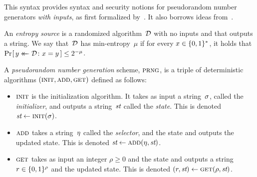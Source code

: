 %
%
%
\label{sec:prng}
This syntax provides syntax and security notions for pseudorandom number
generators \emph{with inputs}, as first formalized by~\cite{barak2005model}. It
also borrows ideas from~\cite{dodis2013security,shrimpton2015provable}.

\begin{definition}\rm
  An \emph{entropy source} is a randomized algorithm~$\mathcal{D}$ with no inputs and
  that outputs a string.
  We say that~$\mathcal{D}$ has min-entropy~$\mu$ if for every
  $x \in \{0,1\}^*$, it holds that
  $
  \Pr\hspace{-1pt}\left[\,y \mathrel{\leftarrow\mkern-14mu\leftarrow} \mathcal{D}\colon x = y\,\right] \leq 2^{-\mu}
  $. \dqed
\end{definition}
%
%
%

\begin{definition}[PRNG]\rm
  A \emph{pseudorandom number generation} scheme, $\textsc{prng}$, is a triple of
  deterministic algorithms $(\textsc{init}, \textsc{add}, \textsc{get})$ defined as follows:
  \begin{itemize}
    \item $\textsc{init}$ is the initialization algorithm. It takes as input a
      string~$\sigma$, called the \emph{initializer}, and outputs a string~$\textit{st}$
      called the \emph{state}.
      This is denoted $\textit{st} \gets \textsc{init}(\sigma)$.

    \item $\textsc{add}$ takes a string~$\eta$ called the \emph{selector},
      and the state and outputs the updated state.
      This is denoted $\textit{st} \gets \textsc{add}(\eta, \textit{st})$.

    \item $\textsc{get}$ takes as input an integer $\rho \geq 0$
      and the state and
      outputs a string $r \in \{0,1\}^\rho$ and the updated state.
      This is denoted $(r, \textit{st}) \gets \textsc{get}(\rho, \textit{st})$.
      \dqed
  \end{itemize}
\end{definition}


